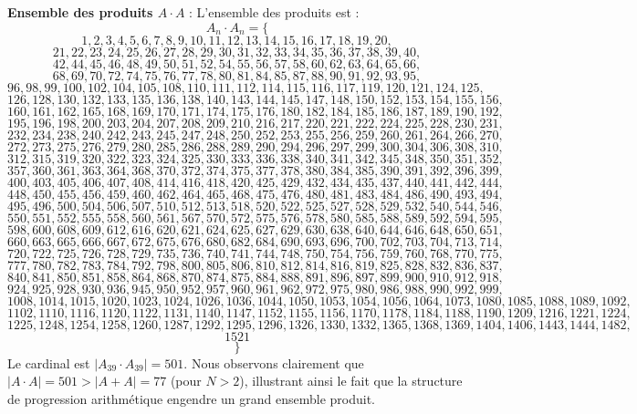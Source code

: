 \documentclass[11pt,a4paper]{article}
\begin{document}
\textbf{Ensemble des produits $A \cdot A$} :
L'ensemble des produits est :
$$ A_{{{n}}} \cdot A_{{{n}}} = \{ $$$$ 1, 2, 3, 4, 5, 6, 7, 8, 9, 10, 11, 12, 13, 14, 15, 16, 17, 18, 19, 20, $$$$ 21, 22, 23, 24, 25, 26, 27, 28, 29, 30, 31, 32, 33, 34, 35, 36, 37, 38, 39, 40, $$$$ 42, 44, 45, 46, 48, 49, 50, 51, 52, 54, 55, 56, 57, 58, 60, 62, 63, 64, 65, 66, $$$$ 68, 69, 70, 72, 74, 75, 76, 77, 78, 80, 81, 84, 85, 87, 88, 90, 91, 92, 93, 95, $$$$ 96, 98, 99, 100, 102, 104, 105, 108, 110, 111, 112, 114, 115, 116, 117, 119, 120, 121, 124, 125, $$$$ 126, 128, 130, 132, 133, 135, 136, 138, 140, 143, 144, 145, 147, 148, 150, 152, 153, 154, 155, 156, $$$$ 160, 161, 162, 165, 168, 169, 170, 171, 174, 175, 176, 180, 182, 184, 185, 186, 187, 189, 190, 192, $$$$ 195, 196, 198, 200, 203, 204, 207, 208, 209, 210, 216, 217, 220, 221, 222, 224, 225, 228, 230, 231, $$$$ 232, 234, 238, 240, 242, 243, 245, 247, 248, 250, 252, 253, 255, 256, 259, 260, 261, 264, 266, 270, $$$$ 272, 273, 275, 276, 279, 280, 285, 286, 288, 289, 290, 294, 296, 297, 299, 300, 304, 306, 308, 310, $$$$ 312, 315, 319, 320, 322, 323, 324, 325, 330, 333, 336, 338, 340, 341, 342, 345, 348, 350, 351, 352, $$$$ 357, 360, 361, 363, 364, 368, 370, 372, 374, 375, 377, 378, 380, 384, 385, 390, 391, 392, 396, 399, $$$$ 400, 403, 405, 406, 407, 408, 414, 416, 418, 420, 425, 429, 432, 434, 435, 437, 440, 441, 442, 444, $$$$ 448, 450, 455, 456, 459, 460, 462, 464, 465, 468, 475, 476, 480, 481, 483, 484, 486, 490, 493, 494, $$$$ 495, 496, 500, 504, 506, 507, 510, 512, 513, 518, 520, 522, 525, 527, 528, 529, 532, 540, 544, 546, $$$$ 550, 551, 552, 555, 558, 560, 561, 567, 570, 572, 575, 576, 578, 580, 585, 588, 589, 592, 594, 595, $$$$ 598, 600, 608, 609, 612, 616, 620, 621, 624, 625, 627, 629, 630, 638, 640, 644, 646, 648, 650, 651, $$$$ 660, 663, 665, 666, 667, 672, 675, 676, 680, 682, 684, 690, 693, 696, 700, 702, 703, 704, 713, 714, $$$$ 720, 722, 725, 726, 728, 729, 735, 736, 740, 741, 744, 748, 750, 754, 756, 759, 760, 768, 770, 775, $$$$ 777, 780, 782, 783, 784, 792, 798, 800, 805, 806, 810, 812, 814, 816, 819, 825, 828, 832, 836, 837, $$$$ 840, 841, 850, 851, 858, 864, 868, 870, 874, 875, 884, 888, 891, 896, 897, 899, 900, 910, 912, 918, $$$$ 924, 925, 928, 930, 936, 945, 950, 952, 957, 960, 961, 962, 972, 975, 980, 986, 988, 990, 992, 999, $$$$ 1008, 1014, 1015, 1020, 1023, 1024, 1026, 1036, 1044, 1050, 1053, 1054, 1056, 1064, 1073, 1080, 1085, 1088, 1089, 1092, $$$$ 1102, 1110, 1116, 1120, 1122, 1131, 1140, 1147, 1152, 1155, 1156, 1170, 1178, 1184, 1188, 1190, 1209, 1216, 1221, 1224, $$$$ 1225, 1248, 1254, 1258, 1260, 1287, 1292, 1295, 1296, 1326, 1330, 1332, 1365, 1368, 1369, 1404, 1406, 1443, 1444, 1482, $$$$ 1521 $$$$ \} $$
Le cardinal est $|A_{39} \cdot A_{39}| = 501$.
Nous observons clairement que $|A \cdot A| = 501 > |A+A| = 77$ (pour $N > 2$), illustrant ainsi le fait que la structure de progression arithmétique engendre un grand ensemble produit.
\newpage
\end{document}
